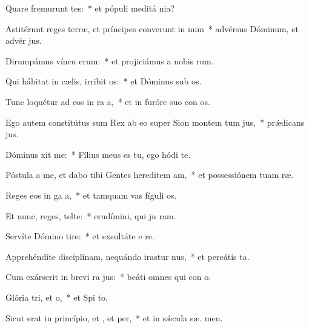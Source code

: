 \item Quare fremurunt tes:~* et pópuli meditá  nia?
\item Astitérunt reges terræ, et príncipes converunt in num~* advérsus Dóminum, et advér  jus.
\item Dirumpámus víncu erum:~* et projiciámus a nobis  rum.
\item Qui hábitat in cælis, irribit os:~* et Dóminus sub os.
\item Tunc loquétur ad eos in ra a,~* et in furóre suo con os.
\item Ego autem constitútus sum Rex ab eo super Sion montem tum jus,~* prǽdicans  jus.
\item Dóminus xit  me:~* Fílius meus es tu, ego hódi  te.
\item Póstula a me, et dabo tibi Gentes hereditem am,~* et possessiónem tuam  ræ.
\item Reges eos in ga a,~* et tamquam vas fíguli  os.
\item Et nunc, reges, telte:~* erudímini, qui ju ram.
\item Servíte Dómino  tire:~* et exsultáte e  re.
\item Apprehéndite disciplínam, nequándo irastur nus,~* et pereátis   ta.
\item Cum exárserit in brevi ra jus:~* beáti omnes qui con  o.
\item Glória tri, et o,~* et Spi to.
\item Sicut erat in princípio, et , et per,~* et in sǽcula sæ. men.
